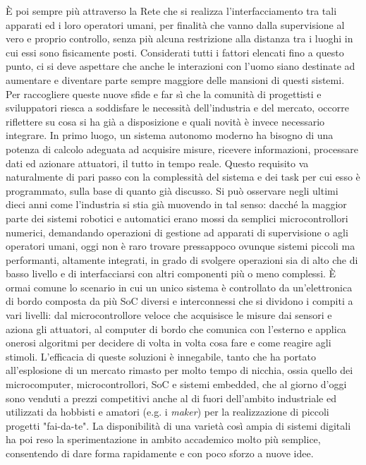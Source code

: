È poi sempre più attraverso la Rete che si realizza l'interfacciamento tra tali apparati ed i loro operatori umani, per finalità che vanno dalla supervisione al vero e proprio controllo, senza più alcuna restrizione alla distanza tra i luoghi in cui essi sono fisicamente posti. Considerati tutti i fattori elencati fino a questo punto, ci si deve aspettare che anche le interazioni con l'uomo siano destinate ad aumentare e diventare parte sempre maggiore delle mansioni di questi sistemi. Per raccogliere queste nuove sfide e far sì che la comunità di progettisti e sviluppatori riesca a soddisfare le necessità dell'industria e del mercato, occorre riflettere su cosa si ha già a disposizione e quali novità è invece necessario integrare. In primo luogo, un sistema autonomo moderno ha bisogno di una potenza di calcolo adeguata ad acquisire misure, ricevere informazioni, processare dati ed azionare attuatori, il tutto in tempo reale. Questo requisito va naturalmente di pari passo con la complessità del sistema e dei task per cui esso è programmato, sulla base di quanto già discusso. Si può osservare negli ultimi dieci anni come l'industria si stia già muovendo in tal senso: dacché la maggior parte dei sistemi robotici e automatici erano mossi da semplici microcontrollori numerici, demandando operazioni di gestione ad apparati di supervisione o agli operatori umani, oggi non è raro trovare pressappoco ovunque sistemi piccoli ma performanti, altamente integrati, in grado di svolgere operazioni sia di alto che di basso livello e di interfacciarsi con altri componenti più o meno complessi. È ormai comune lo scenario in cui un unico sistema è controllato da un'elettronica di bordo composta da più SoC diversi e interconnessi che si dividono i compiti a vari livelli: dal microcontrollore veloce che acquisisce le misure dai sensori e aziona gli attuatori, al computer di bordo che comunica con l'esterno e applica onerosi algoritmi per decidere di volta in volta cosa fare e come reagire agli stimoli. L'efficacia di queste soluzioni è innegabile, tanto che ha portato all'esplosione di un mercato rimasto per molto tempo di nicchia, ossia quello dei microcomputer, microcontrollori, SoC e sistemi embedded, che al giorno d'oggi sono venduti a prezzi competitivi anche al di fuori dell'ambito industriale ed utilizzati da hobbisti e amatori (e.g. i \emph{maker}) per la realizzazione di piccoli progetti "fai-da-te". La disponibilità di una varietà così ampia di sistemi digitali ha poi reso la sperimentazione in ambito accademico molto più semplice, consentendo di dare forma rapidamente e con poco sforzo a nuove idee.\\
